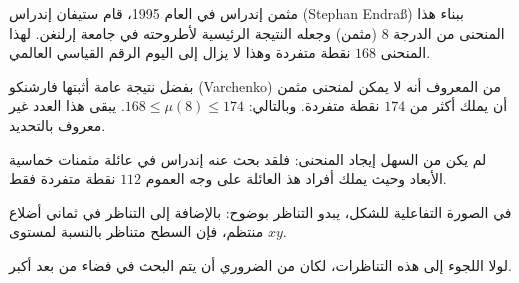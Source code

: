 \begin{surferPage}{مثمن إندراس}
    في العام 1995، قام ستيفان إندراس (Stephan Endraß) ببناء هذا المنحنى من الدرجة $8$ (مثمن) وجعله النتيجة الرئيسية لأطروحته في جامعة إرلنغن.
     لهذا المنحنى $168$ نقطة متفردة وهذا لا يزال إلى اليوم الرقم القياسي العالمي.
  
     بفضل نتيجة عامة أثبتها فارشنكو (Varchenko) من المعروف أنه لا يمكن لمنحنى مثمن أن يملك أكثر من $174$ نقطة متفردة.
    وبالتالي: $168 \le \mu(8) \le 174$.
    يبقى هذا العدد غير معروف بالتحديد.

     لم يكن من السهل إيجاد المنحنى: فلقد بحث عنه إندراس في عائلة مثمنات خماسية الأبعاد وحيث يملك أفراد هذ العائلة على وجه العموم $112$ نقطة متفردة فقط.

    في الصورة التفاعلية للشكل، يبدو التناظر بوضوح: 
    بالإضافة إلى التناظر في ثماني أضلاع منتظم، فإن السطح متناظر بالنسبة لمستوى $xy$.

     لولا اللجوء إلى هذه التناظرات، لكان من الضروري أن يتم البحث في فضاء من بعد أكبر. 
\end{surferPage}
